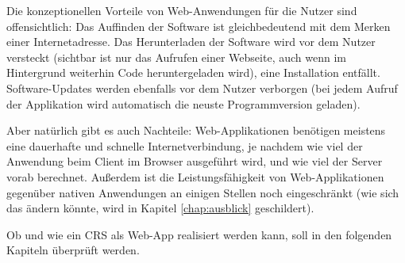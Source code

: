 Die konzeptionellen Vorteile von Web-Anwendungen für die Nutzer sind offensichtlich: Das Auffinden der Software ist gleichbedeutend mit dem Merken einer Internetadresse. Das Herunterladen der Software wird vor dem Nutzer versteckt (sichtbar ist nur das Aufrufen einer Webseite, auch wenn im Hintergrund weiterhin Code heruntergeladen wird), eine Installation entfällt. Software-Updates werden ebenfalls vor dem Nutzer verborgen (bei jedem Aufruf der Applikation wird automatisch die neuste Programmversion geladen).

Aber natürlich gibt es auch Nachteile: Web-Applikationen benötigen meistens eine dauerhafte und schnelle Internetverbindung, je nachdem wie viel der Anwendung beim Client im Browser ausgeführt wird, und wie viel der Server vorab berechnet. Außerdem ist die Leistungsfähigkeit von Web-Applikationen gegenüber nativen Anwendungen an einigen Stellen noch eingeschränkt (wie sich das ändern könnte, wird in Kapitel \ref{chap:ausblick} geschildert).

Ob und wie ein CRS als Web-App realisiert werden kann, soll in den folgenden Kapiteln überprüft werden.

